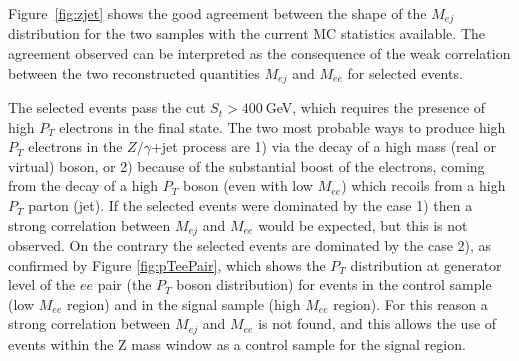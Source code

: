 Figure~\ref{fig:zjet} shows the good agreement between the shape of the $M_{ej}$ distribution for the two samples 
with the current MC statistics available. The agreement observed can be interpreted as the consequence of the 
weak correlation between the two reconstructed quantities $M_{ej}$ and $M_{ee}$ for selected events.  

The selected events pass the cut $S_{t}>400~$GeV, which requires the presence of high $P_{T}$ electrons in the final state. 
The two most probable ways to produce high $P_{T}$ electrons in the $Z/\gamma$+jet process are 1) via the decay of a high mass (real or virtual) boson, 
or 2) because of the substantial boost of the electrons, coming from the decay of a high $P_{T}$ boson (even with low $M_{ee}$) 
which recoils from a high $P_{T}$ parton (jet). 
If the selected events were dominated by the case 1) then a strong correlation between $M_{ej}$ and $M_{ee}$ would be expected, but this is not observed.
On the contrary the selected events are dominated by the case 2), as confirmed by Figure \ref{fig:pTeePair}, which shows the $P_{T}$
distribution at generator level of the $ee$ pair (the $P_{T}$ boson distribution) for events in the control sample (low $M_{ee}$ region) and in the signal sample (high $M_{ee}$ region).
For this reason a strong correlation between $M_{ej}$ and $M_{ee}$ is not found, and this allows the use of events within the 
Z mass window as a control sample for the signal region.

